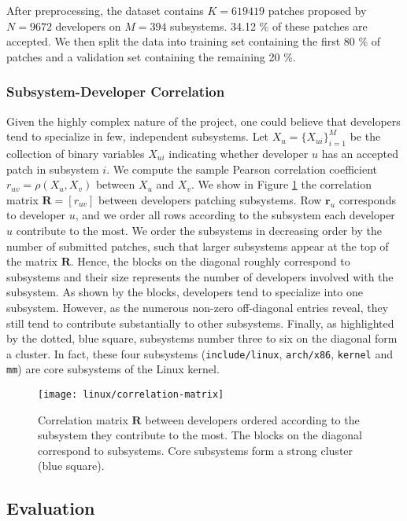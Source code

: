 \documentclass[format=sigconf]{acmart}
\begin{document}
After preprocessing, the dataset contains $K= \num{619419}$ patches proposed by $ N = \num{9672} $ developers on $M = \num{394}$ subsystems.
34.12 \% of these patches are accepted.
We then split the data into training set containing the first 80 \% of patches and a validation set containing the remaining 20 \%.

\subsubsection{Subsystem-Developer Correlation}

Given the highly complex nature of the project, one could believe that developers tend to specialize in few, independent subsystems.
Let $X_u = \{ X_{ui} \}_{i=1}^M$ be the collection of binary variables $ X_{ui} $ indicating whether developer $u$ has an accepted patch in subsystem $i$.
We compute the sample Pearson correlation coefficient $r_{uv} = \rho(X_u, X_v)$ between $X_u$ and $X_v$.
We show in Figure \ref{fig:linux_correlation} the correlation matrix $ \bm{R} = [r_{uv}] $ between developers patching subsystems.
Row $\bm{r}_u$ corresponds to developer $u$, and we order all rows according to the subsystem each developer $u$ contribute to the most.
We order the subsystems in decreasing order by the number of submitted patches, such that larger subsystems appear at the top of the matrix $\bm{R}$.
Hence, the blocks on the diagonal roughly correspond to subsystems and their size represents the number of developers involved with the subsystem.
As shown by the blocks, developers tend to specialize into one subsystem.
However, as the numerous non-zero off-diagonal entries reveal, they still tend to contribute substantially to other subsystems.
Finally, as highlighted by the dotted, blue square, subsystems number three to six on the diagonal form a cluster.
In fact, these four subsystems (\texttt{include/linux}, \texttt{arch/x86}, \texttt{kernel} and \texttt{mm}) are core subsystems of the Linux kernel.

\begin{figure}
  \texttt{[image: linux/correlation-matrix]}
  \caption{Correlation matrix $ \bm{R} $ between developers ordered according to the subsystem they contribute to the most. The blocks on the diagonal correspond to subsystems.
  Core subsystems form a strong cluster (blue square).}
  \label{fig:linux_correlation}
\end{figure}

\subsection{Evaluation}
\end{document}
